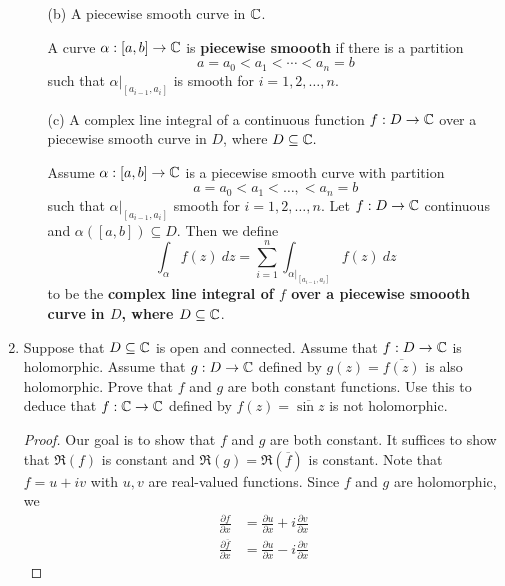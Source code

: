 \documentclass[a4paper]{article}
\begin{document}
\begin{enumerate}
\begin{enumerate}
            \item[(b)] A piecewise smooth curve in \( \mathbb{C}  \).
                \begin{solution}
                    A curve \( \alpha: [a,b] \to \mathbb{C}  \) is \textbf{piecewise smoooth} if there is a partition 
                    \[  a = {a}_{0} < {a}_{1} < \cdots < {a}_{n} = b \]
                    such that \( \alpha \big|_{[{a}_{i-1}, {a}_{i}]} \) is smooth for \( i = 1,2,\dots, n \).
                \end{solution}
            \item[(c)] A complex line integral of a continuous function \( f: D \to \mathbb{C}  \) over a piecewise smooth curve in \( D  \), where \( D \subseteq \mathbb{C} . \)
                \begin{solution}
                    Assume \( \alpha: [a,b] \to \mathbb{C}  \) is a piecewise smooth curve with partition
                    \[  a = {a}_{0} < {a}_{1} < \dots, < {a}_{n} = b \]
                    such that \( \alpha \big|_{[{a}_{i-1}, {a}_{i}]} \) smooth for \( i = 1,2,\dots, n \). Let \( f: D \to \mathbb{C}  \) continuous and \( \alpha([a,b]) \subseteq  D  \). Then we define
                    \[  \int_{ \alpha }^{  } f(z) \ dz = \sum_{ i=1  }^{ n } \int_{ \alpha |_{[{a}_{i-1}, {a}_{i}]} } f(z) \ dz \]
                    to be the \textbf{complex line integral of \( f  \) over a piecewise smoooth curve in \( D  \), where \( D \subseteq \mathbb{C}  \)}.
                    
                \end{solution}
        \end{enumerate}
    \item Suppose that \( D \subseteq \mathbb{C}  \) is open and connected. Assume that \( f: D \to \mathbb{C}  \) is holomorphic. Assume that \( g: D \to \mathbb{C}  \) defined by \( g(z) = \overline{f(z)} \) is also holomorphic. Prove that \( f  \) and \( g  \) are both constant functions. Use this to deduce that \( f: \mathbb{C} \to \mathbb{C}  \) defined by \( f(z) = \overline{\sin z} \) is not holomorphic.
        \begin{proof}
        Our goal is to show that \( f  \) and \( g  \) are both constant. It suffices to show that \( \Re(f) \) is constant and \( \Re(g) = \Re(\overline{f}) \) is constant. Note that \( f = u + iv  \) with \( u,v  \) are real-valued functions. Since \( f  \) and \( g  \) are holomorphic, we 
        \begin{align*}
        \frac{\partial f }{\partial x }  &= \frac{\partial u }{\partial x }  + i \frac{\partial v }{\partial x } \\   
        \frac{\partial \overline{f} }{\partial x  }             &= \frac{\partial u }{\partial x }  - i\frac{\partial v }{\partial x } 
    \end{align*}
        

\end{proof}
\end{enumerate}
\end{document}

